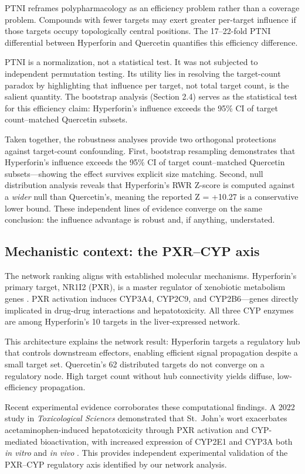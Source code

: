 PTNI reframes polypharmacology as an efficiency problem rather than a coverage problem.
Compounds with fewer targets may exert greater per-target influence if those targets occupy topologically central positions.
The 17--22-fold PTNI differential between Hyperforin and Quercetin quantifies this efficiency difference.

PTNI is a normalization, not a statistical test.
It was not subjected to independent permutation testing.
Its utility lies in resolving the target-count paradox by highlighting that influence per target, not total target count, is the salient quantity.
The bootstrap analysis (Section 2.4) serves as the statistical test for this efficiency claim: Hyperforin's influence exceeds the 95\% CI of target count--matched Quercetin subsets.

Taken together, the robustness analyses provide two orthogonal protections against target-count confounding.
First, bootstrap resampling demonstrates that Hyperforin's influence exceeds the 95\% CI of target count--matched Quercetin subsets---showing the effect survives explicit size matching.
Second, null distribution analysis reveals that Hyperforin's RWR Z-score is computed against a \textit{wider} null than Quercetin's, meaning the reported Z = +10.27 is a conservative lower bound.
These independent lines of evidence converge on the same conclusion: the influence advantage is robust and, if anything, understated.

\subsection{Mechanistic context: the PXR--CYP axis}

The network ranking aligns with established molecular mechanisms.
Hyperforin's primary target, NR1I2 (PXR), is a master regulator of xenobiotic metabolism genes \citep{Moore2000, Watkins2001}.
PXR activation induces CYP3A4, CYP2C9, and CYP2B6---genes directly implicated in drug-drug interactions and hepatotoxicity.
All three CYP enzymes are among Hyperforin's 10 targets in the liver-expressed network.

This architecture explains the network result: Hyperforin targets a regulatory hub that controls downstream effectors, enabling efficient signal propagation despite a small target set.
Quercetin's 62 distributed targets do not converge on a regulatory node.
High target count without hub connectivity yields diffuse, low-efficiency propagation.

Recent experimental evidence corroborates these computational findings.
A 2022 study in \textit{Toxicological Sciences} demonstrated that St.\ John's wort exacerbates acetaminophen-induced hepatotoxicity through PXR activation and CYP-mediated bioactivation, with increased expression of CYP2E1 and CYP3A both \textit{in vitro} and \textit{in vivo} \citep{Chen2022}.
This provides independent experimental validation of the PXR--CYP regulatory axis identified by our network analysis.

